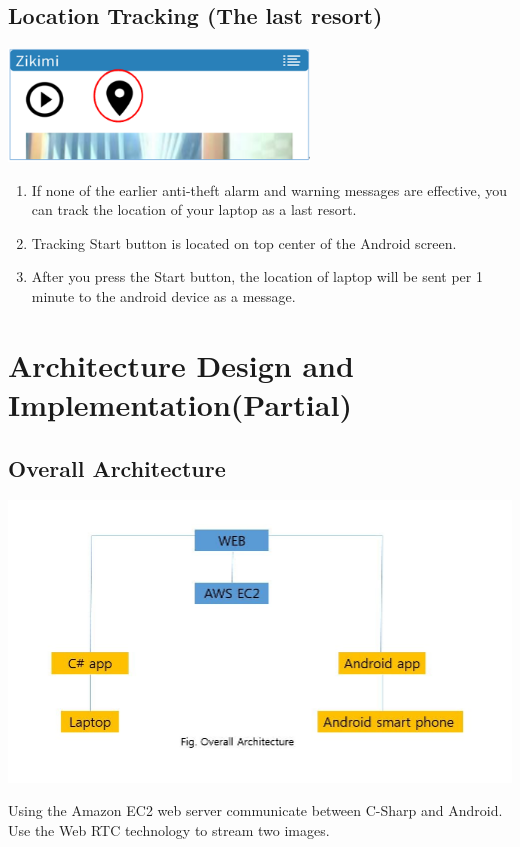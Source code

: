 \documentclass[12pt]{article}
\begin{document}
\subsection{Location Tracking (The last resort)}
\begin{center} 
\includegraphics[width=80mm,scale=1.2]{location}
\end{center}
\begin{enumerate}
\item If none of the earlier anti-theft alarm and warning messages are effective, you can track the location of your laptop as a last resort.
\item Tracking Start button is located on top center of the Android screen.
\item After you press the Start button, the location of laptop will be sent per 1 minute to the android device as a message.
\end{enumerate}



\newpage\section{Architecture Design and Implementation(Partial)}

\subsection*{Overall Architecture}
\begin{center} 
\includegraphics[width=140mm,scale=1.8]{overallarchitecture}
\end{center}
Using the Amazon EC2 web server communicate between C-Sharp and Android. Use the Web RTC technology to stream two images.
\end{document}
